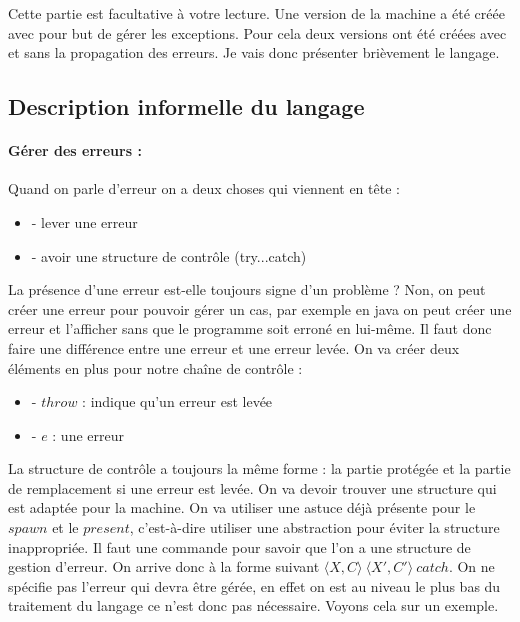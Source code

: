 \documentclass[10pt,a4paper]{report}
\begin{document}
	Cette partie est facultative à votre lecture. Une version de la machine a été créée avec pour but de gérer les exceptions. Pour cela deux versions ont été créées avec et sans la propagation des erreurs. Je vais donc présenter brièvement le langage.
	
	\subsection{Description informelle du langage}
	
	\paragraph{Gérer des erreurs :} Quand on parle d'erreur on a deux choses qui viennent en tête :
	\begin{itemize}
		\item[] - lever une erreur
		\item[] - avoir une structure de contrôle (try...catch)
	\end{itemize}
	La présence d'une erreur est-elle toujours signe d'un problème ? Non, on peut créer une erreur pour pouvoir gérer un cas, par exemple en java on peut créer une erreur et l'afficher sans que le programme soit erroné en lui-même. Il faut donc faire une différence entre une erreur et une erreur levée. On va créer deux éléments en plus pour notre chaîne de contrôle :
	\begin{itemize}
		\item[] - $throw$ : indique qu'un erreur est levée
		\item[] - $e$ : une erreur
	\end{itemize} 
	La structure de contrôle a toujours la même forme : la partie protégée et la partie de remplacement si une erreur est levée. On va devoir trouver une structure qui est adaptée pour la machine. On va utiliser une astuce déjà présente pour le $spawn$ et le $present$, c'est-à-dire utiliser une abstraction pour éviter la structure inappropriée. Il faut une commande pour savoir que l'on a une structure de gestion d'erreur. On arrive donc à la forme suivant $\langle X,C\rangle~\langle X',C'\rangle~catch$. On ne spécifie pas l'erreur qui devra être gérée, en effet on est au niveau le plus bas du traitement du langage ce n'est donc pas nécessaire. Voyons cela sur un exemple.
\end{document}
